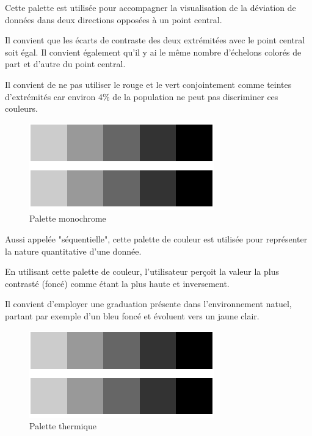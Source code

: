 \documentclass[a4paper,12pt]{article}
\begin{document}
\begin{multicols}{2}
Cette palette est utilisée pour accompagner la visualisation de la déviation de données dans deux directions opposées à un point central. \autocite{wilkeColorScales2019}

Il convient que les écarts de contraste des deux extrémitées avec le point central soit égal. Il convient également qu'il y ai le même nombre d'échelons colorés de part et d'autre du point central. \autocite{wilkeColorScales2019}

Il convient de ne pas utiliser le rouge et le vert conjointement comme teintes d'extrémités car environ 4\% de la population ne peut pas discriminer ces couleurs. \autocite{schwabishCenteringAccessibilityData2022a}

\begin{figure}[H]
\centering
\includegraphics[width=.9\linewidth]{./img/palette-monochrome.pdf}
\caption{\label{fig:org4f91d9f}Palette monochrome}
\end{figure}

Aussi appelée "séquentielle", cette palette de couleur est utilisée pour représenter la nature quantitative d'une donnée. \autocite{wilkeColorScales2019}

En utilisant cette palette de couleur, l'utilisateur perçoit la valeur la plus contrasté (foncé) comme étant la plus haute et inversement. \autocite{REF???}

Il convient d'employer une graduation présente dans l'environnement natuel, partant par exemple d'un bleu foncé et évoluent vers un jaune clair. \autocite{wilkeColorScales2019}

\begin{figure}[H]
\centering
\includegraphics[width=.9\linewidth]{./img/palette-thermique.pdf}
\caption{\label{fig:org0d38159}Palette thermique}
\end{figure}


\end{multicols}
\end{document}
